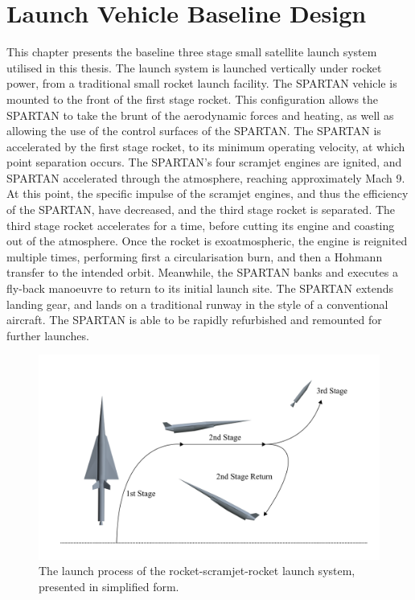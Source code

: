 
\cleardoublepage
\chapter{Launch Vehicle Baseline Design}\label{chapter:methodology}


This chapter presents the baseline three stage small satellite launch system utilised in this thesis. The launch system is launched vertically under rocket power, from a traditional small rocket launch facility. The SPARTAN vehicle is mounted to the front of the first stage rocket. This configuration allows the SPARTAN to take the brunt of the aerodynamic forces and heating, as well as allowing the use of the control surfaces of the SPARTAN. The SPARTAN is accelerated by the first stage rocket, to its minimum operating velocity, at which point separation occurs. The SPARTAN's four scramjet engines are ignited, and SPARTAN accelerated through the atmosphere, reaching approximately Mach 9. At this point, the specific impulse of the scramjet engines, and thus the efficiency of the SPARTAN, have decreased, and the third stage rocket is separated. The third stage rocket accelerates for a time, before cutting its engine and coasting out of the atmosphere. Once the rocket is exoatmospheric, the engine is reignited multiple times, performing first a circularisation burn, and then a Hohmann transfer to the intended orbit. Meanwhile, the SPARTAN banks and executes a fly-back manoeuvre to return to its initial launch site. The SPARTAN extends landing gear, and lands on a traditional runway in the style of a conventional aircraft. The SPARTAN is able to be rapidly refurbished and remounted for further launches. 


\begin{figure}
	\centering
	\includegraphics[width=0.9\linewidth]{figures/3_vehicle_design/Trajsimple}
	\caption{The launch process of the rocket-scramjet-rocket launch system, presented in simplified form.}
	\label{fig:Trajsimple}
\end{figure}

